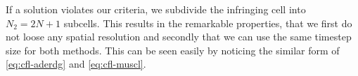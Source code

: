 If a solution violates our criteria, we subdivide the infringing cell into $N_2 = 2N + 1$ subcells.
This results in the remarkable properties, that we first do not loose any spatial resolution and secondly that we can use the same timestep size for both methods.
This can be seen easily by noticing the similar form of \cref{eq:cfl-aderdg} and \cref{eq:cfl-muscl}.

